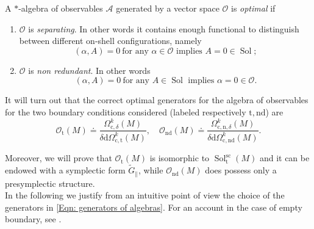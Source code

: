 \begin{Definition}\label{Def: optimality} A $*$-algebra of observables $\mathcal{A}$ generated by a vector space $\mathcal{O}$ is \emph{optimal} if
	\begin{enumerate}
		\item $\mathcal{O}$ is \emph{separating}. In other words it contains enough functional to distinguish between different on-shell configurations, namely 
		\[	(\alpha,A)=0\ \text{for any }\alpha\in\mathcal{O}\text{ implies } A=0\in\operatorname{Sol};		\]
		\item $\mathcal{O}$ is \emph{non redundant}. In other words 
		\[	(\alpha,A)=0\ \text{for any }A\in\operatorname{Sol}\text{ implies } \alpha=0\in\mathcal{O} .		\]
	\end{enumerate}
\end{Definition}



It will turn out that the correct optimal generators for the algebra of observables for the two boundary conditions considered (labeled respectively $\mathrm{t,nd}$) are
\begin{equation}\label{Eqn: generators of algebras}
	\mathcal{O}_{\mathrm{t}}(M)\doteq \frac{\Omega_{\mathrm{c},\delta}^k(M)}{\delta\mathrm{d}\Omega_{\mathrm{c,t}}^k(M)},\quad \mathcal{O}_{\mathrm{nd}}(M)\doteq\frac{\Omega_{\mathrm{c,n},\delta}^k(M)}{\delta\mathrm{d}\Omega_{\mathrm{c,nd}}^k(M)}.
\end{equation}

Moreover, we will prove that $\mathcal{O}_{\mathrm{t}}(M)$ is isomorphic to $\operatorname{Sol}_{\mathrm{t}}^{\mathrm{sc}}(M)$ and it can be endowed with a symplectic form $\widetilde{G}_\parallel$, while $\mathcal{O}_{\mathrm{nd}}(M)$ does possess only a presymplectic structure.\\

In the following we justify from an intuitive point of view the choice of the generators in \eqref{Eqn: generators of algebras}. For an account in the case of empty boundary, see \cite[Sec. 7.2]{Benini-16}.

